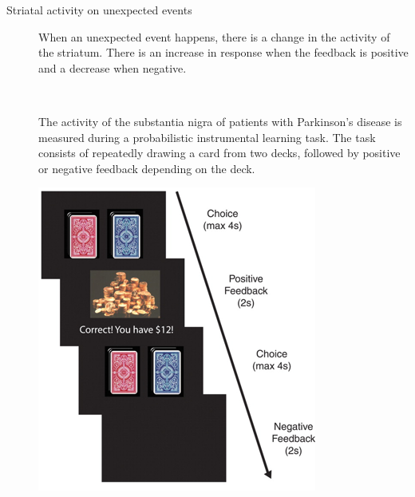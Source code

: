 \begin{description}
    \item[Striatal activity on unexpected events] 
        When an unexpected event happens, there is a change in the activity of the striatum.
        There is an increase in response when the feedback is positive and a decrease when negative.

        \begin{casestudy}
            \phantom{}\\
            \begin{minipage}{0.7\linewidth}
                The activity of the substantia nigra of patients with Parkinson's disease is measured during a probabilistic instrumental learning task.
                The task consists of repeatedly drawing a card from two decks, followed by positive or negative feedback depending on the deck.
            \end{minipage}
            \begin{minipage}{0.28\linewidth}
                \centering
                \includegraphics[width=0.95\linewidth]{./img/instrumental_dopamine_sn1.png}
            \end{minipage}


\end{casestudy}
\end{description}
